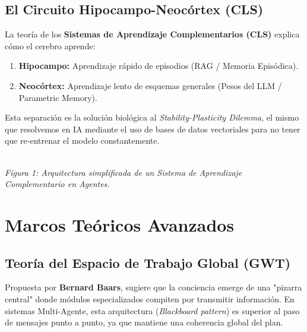 \documentclass[11pt,a4paper,oneside]{article}
\begin{document}
\subsection{El Circuito Hipocampo-Neocórtex (CLS)}
La teoría de los \textbf{Sistemas de Aprendizaje Complementarios (CLS)} explica cómo el cerebro aprende:
\begin{enumerate}
    \item \textbf{Hipocampo:} Aprendizaje rápido de episodios (RAG / Memoria Episódica).
    \item \textbf{Neocórtex:} Aprendizaje lento de esquemas generales (Pesos del LLM / Parametric Memory).
\end{enumerate}
Esta separación es la solución biológica al \textit{Stability-Plasticity Dilemma}, el mismo que resolvemos en IA mediante el uso de bases de datos vectoriales para no tener que re-entrenar el modelo constantemente.

\begin{center}
\\ \textit{Figura 1: Arquitectura simplificada de un Sistema de Aprendizaje Complementario en Agentes.}
\end{center}

\section{Marcos Teóricos Avanzados}

\subsection{Teoría del Espacio de Trabajo Global (GWT)}
Propuesta por \textbf{Bernard Baars}, sugiere que la conciencia emerge de una "pizarra central" donde módulos especializados compiten por transmitir información. En sistemas Multi-Agente, esta arquitectura (\textit{Blackboard pattern}) es superior al paso de mensajes punto a punto, ya que mantiene una coherencia global del plan.
\end{document}
